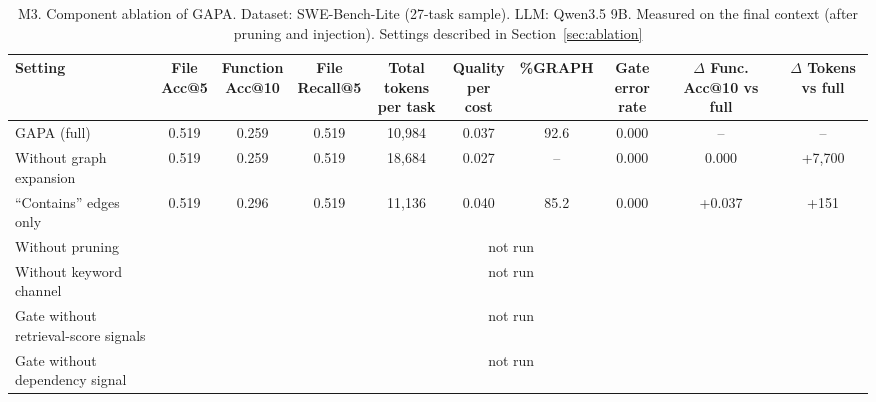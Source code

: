 \begin{table}[t]\scriptsize\centering\setlength{\tabcolsep}{3pt}
\caption{M3. Component ablation of GAPA. Dataset: SWE-Bench-Lite (27-task sample). LLM: Qwen3.5 9B. Measured on the final context (after pruning and injection). Settings described in Section~\ref{sec:ablation}}\label{tab:m3}
\begin{tabular}{@{}p{}ccccccccc@{}}\toprule
Setting & \makecell{File\\Acc@5} & \makecell{Function\\Acc@10} & \makecell{File\\Recall@5} & \makecell{Total tokens\\per task} & \makecell{Quality\\per cost} & \%GRAPH & \makecell{Gate\\error rate} & \makecell{$\Delta$ Func.\\Acc@10 vs full} & \makecell{$\Delta$ Tokens\\vs full}\\\midrule
GAPA (full) & 0.519 & 0.259 & 0.519 & 10{,}984 & 0.037 & 92.6 & 0.000 & -- & --\\
Without graph expansion & 0.519 & 0.259 & 0.519 & 18{,}684 & 0.027 & -- & 0.000 & 0.000 & +7{,}700\\
``Contains'' edges only & 0.519 & 0.296 & 0.519 & 11{,}136 & 0.040 & 85.2 & 0.000 & +0.037 & +151\\
Without pruning & \multicolumn{9}{c}{not run}\\
Without keyword channel & \multicolumn{9}{c}{not run}\\
Gate without retrieval-score signals & \multicolumn{9}{c}{not run}\\
Gate without dependency signal & \multicolumn{9}{c}{not run}\\\bottomrule
\end{tabular}
\end{table}